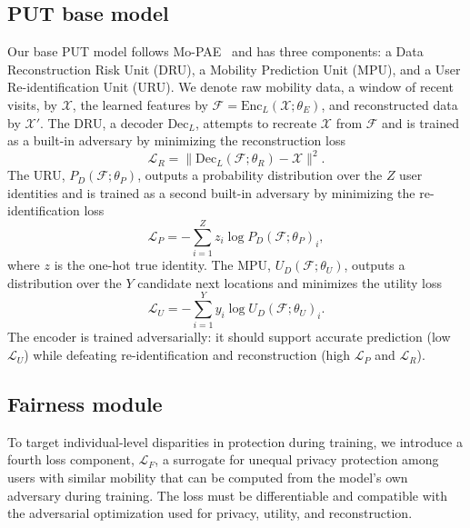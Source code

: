 \documentclass[sigconf,anonymous,review]{acmart}
\begin{document}
\subsection{PUT base model}
Our base PUT model follows Mo-PAE~\cite{zhan2023mopae} and has three components: a Data Reconstruction Risk Unit (DRU), a Mobility Prediction Unit (MPU), and a User Re-identification Unit (URU). We denote raw mobility data, a window of recent visits, by $\mathcal{X}$, the learned features by $\mathcal{F}=\mathrm{Enc}_L(\mathcal{X};\theta_E)$, and reconstructed data by $\mathcal{X}'$. The DRU, a decoder $\mathrm{Dec}_L$, attempts to recreate $\mathcal{X}$ from $\mathcal{F}$ and is trained as a built-in adversary by minimizing the reconstruction loss
\begin{equation}
\mathcal{L}_R = \lVert \mathrm{Dec}_L(\mathcal{F};\theta_R) - \mathcal{X}\rVert^2 .
\end{equation}
The URU, $P_D(\mathcal{F};\theta_P)$, outputs a probability distribution over the $Z$ user identities and is trained as a second built-in adversary by minimizing the re-identification loss
\begin{equation}
\mathcal{L}_P = -\sum_{i=1}^{Z} z_i \log P_D(\mathcal{F};\theta_P)_i ,
\end{equation}
where $z$ is the one-hot true identity. The MPU, $U_D(\mathcal{F};\theta_U)$, outputs a distribution over the $Y$ candidate next locations and minimizes the utility loss
\begin{equation}
\mathcal{L}_U = -\sum_{i=1}^{Y} y_i \log U_D(\mathcal{F};\theta_U)_i .
\end{equation}
The encoder is trained adversarially: it should support accurate prediction (low $\mathcal{L}_U$) while defeating re-identification and reconstruction (high $\mathcal{L}_P$ and $\mathcal{L}_R$).

\subsection{Fairness module}
To target individual-level disparities in protection during training, we introduce a fourth loss component, $\mathcal{L}_F$, a surrogate for unequal privacy protection among users with similar mobility that can be computed from the model's own adversary during training. The loss must be differentiable and compatible with the adversarial optimization used for privacy, utility, and reconstruction.
\end{document}
